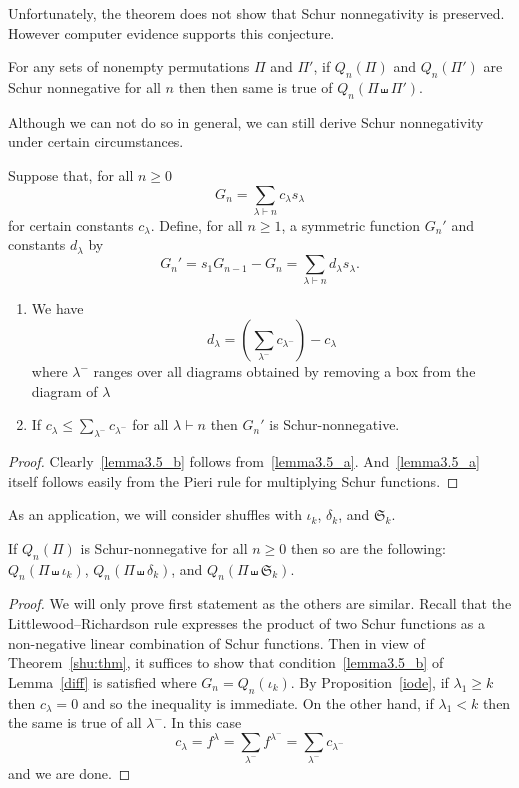 \documentclass[ALCO,ThmDefs,Unicode,epreuves]{cedram}
\newcommand{\shu}{\shuffle}
\newcommand{\ptn}{\vdash}
\newcommand{\de}{\delta}
\newcommand{\io}{\iota}
\newcommand{\la}{\lambda}
\newcommand{\fS}{{\mathfrak S}}
\begin{document}
Unfortunately, the theorem does not show that Schur nonnegativity is preserved. However computer evidence supports this conjecture.
\begin{conj}
\label{shu:non}
For any sets of nonempty permutations $\Pi$ and $\Pi'$, if $Q_n(\Pi)$ and $Q_n(\Pi')$ are Schur nonnegative for all $n$ then then same is true of $Q_n(\Pi\shu\Pi')$.
\end{conj}

Although we can not do so in general, we can still derive Schur nonnegativity under certain circumstances.
\begin{lemm}
\label{diff}
Suppose that, for all $n\ge0$
\[
G_n= \sum_{\la\ptn n} c_\la s_\la
\]
for certain constants $c_\la$. Define, for all $n\ge1$, a symmetric function $G_n'$ and constants $d_\la$ by
\[
G_n'=s_1 G_{n-1} - G_n = \sum_{\la\ptn n} d_\la s_\la.
\]
\begin{enumerate}
\item\label{lemma3.5_a}%
We have
\[
d_\la = \left( \sum_{\la^-} c_{\la^-} \right) - c_\la
\]
where $\la^-$ ranges over all diagrams obtained by removing a box from the diagram of $\la$
\item\label{lemma3.5_b}%
If $c_\la \le \sum_{\la^-} c_{\la^-} $ for all $\la\ptn n$ then $G_n'$ is Schur-nonnegative.
\end{enumerate}
\end{lemm}
\begin{proof}
Clearly~\eqref{lemma3.5_b} follows from~\eqref{lemma3.5_a}. And~\eqref{lemma3.5_a} itself follows easily from the Pieri rule for multiplying Schur functions.
\end{proof}

As an application, we will consider shuffles with $\io_k$, $\de_k$, and $\fS_k$.
\begin{coro}
If $Q_n(\Pi)$ is Schur-nonnegative for all $n\ge0$ then so are the following: $Q_n(\Pi\shuffle\io_k)$, $Q_n(\Pi\shuffle\de_k)$, and $Q_n(\Pi\shuffle \fS_k)$.
\end{coro}
\begin{proof}
We will only prove first statement as the others are similar. 
Recall that the Littlewood--Richardson rule expresses the product of two Schur functions as a non-negative linear combination of Schur functions.
Then in view of Theorem~\ref{shu:thm}, it suffices to show that condition~\eqref{lemma3.5_b} of Lemma~\ref{diff} is satisfied where $G_n=Q_n(\io_k)$. 
By Proposition~\ref{iode}, if $\la_1\ge k$ then $c_\la=0$ and so the inequality is immediate.
On the other hand, if $\la_1<k$ then the same is true of all $\la^-$. In this case
\[
c_\la=f^\la=\sum_{\la^-} f^{\la^-} =\sum_{\la^-} c_{\la^-}
\]
and we are done.
\end{proof} 
\end{document}
